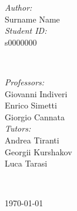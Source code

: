 \begin{titlepage}

\begin{minipage}{0.4\textwidth}
\begin{flushleft} \large
\emph{Author:}\\[0.2cm]
Surname Name %
\\[1.2em]
\emph{Student ID:}\\[0.2cm]
s0000000 \\[1.2em]
\end{flushleft}
\end{minipage}
~
\begin{minipage}{0.4\textwidth}
\begin{flushright} \large
\emph{Professors:} \\[0.2cm]
Giovanni Indiveri\\
Enrico Simetti\\
Giorgio Cannata  \\[1.2em] %

\emph{Tutors:} \\[0.2cm]
Andrea Tiranti\\
Georgii Kurshakov\\
Luca Tarasi
\end{flushright}
\end{minipage}\\[2cm]
\makeatother



{\large \today}\\[2cm] %

\vfill %

\end{titlepage}